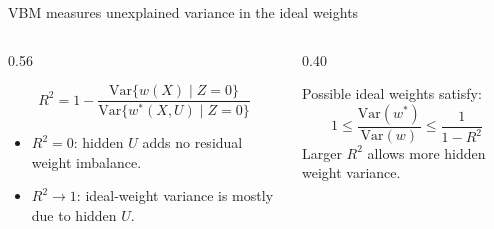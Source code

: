 \documentclass[aspectratio=169,10pt]{ctexbeamer}
\begin{document}
\begin{frame}{VBM measures unexplained variance in the ideal weights}
  \begin{columns}[T,totalwidth=\textwidth]
    \begin{column}{0.56\textwidth}
      \begin{bluebox}[title=Variance-based sensitivity parameter]
        \[
          R^2
          =
          1-
          \frac{\mathrm{Var}\{w(X)\mid Z=0\}}
              {\mathrm{Var}\{w^*(X,U)\mid Z=0\}}
        \]
      \end{bluebox}
      \vspace{0.25cm}
      \begin{graybox}
        \begin{itemize}
          \item $R^2=0$: hidden $U$ adds no residual weight imbalance.
          \item $R^2\to1$: ideal-weight variance is mostly due to hidden $U$.
        \end{itemize}
      \end{graybox}
    \end{column}
    \begin{column}{0.40\textwidth}
      \begin{yellowbox}[title=Sensitivity set]
        \small
        Possible ideal weights satisfy:
        \[
          1\le
          \frac{\mathrm{Var}(w^*)}{\mathrm{Var}(w)}
          \le
          \frac{1}{1-R^2}
        \]
        Larger $R^2$ allows more hidden weight variance.
      \end{yellowbox}
    \end{column}
  \end{columns}
\end{frame}
\end{document}
